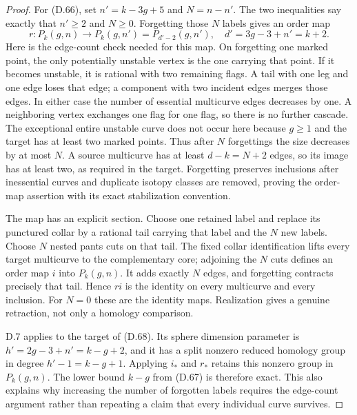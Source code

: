 \begin{proof}
For (D.66), set $n'=k-3g+5$ and $N=n-n'$.  The two
inequalities say exactly that $n'\geq2$ and $N\geq0$.
Forgetting those $N$ labels gives an order map
\[
 r:P_k(g,n)\longrightarrow
       P_k(g,n')=P_{d'-2}(g,n'),\quad d'=3g-3+n'=k+2.
                                                               \tag{D.68}
\]
Here is the edge-count check needed for this map.
On forgetting one marked point, the only potentially
unstable vertex is the one carrying that point.  If it
becomes unstable, it is rational with two remaining
flags.  A tail with one leg and one edge loses that
edge; a component with two incident edges merges those
edges.  In either case the number of essential
multicurve edges decreases by one.  A neighboring
vertex exchanges one flag for one flag, so there is
no further cascade.  The exceptional entire unstable
curve does not occur here because $g\geq1$ and the
target has at least two marked points.  Thus after
$N$ forgettings the size decreases by at most $N$.
A source multicurve has at least
$d-k=N+2$ edges, so its image has at least two,
as required in the target.  Forgetting preserves
inclusions after inessential curves and duplicate
isotopy classes are removed, proving the order-map
assertion with its exact stabilization convention.

The map has an explicit section.  Choose one retained
label and replace its punctured collar by a rational
tail carrying that label and the $N$ new labels.
Choose $N$ nested pants cuts on that tail.  The fixed
collar identification lifts every target multicurve
to the complementary core; adjoining the $N$ cuts
defines an order map $i$ into $P_k(g,n)$.  It adds
exactly $N$ edges, and forgetting contracts precisely
that tail.  Hence $r i$ is the identity on every
multicurve and every inclusion.  For $N=0$ these are
the identity maps.  Realization gives a genuine
retraction, not only a homology comparison.

D.7 applies to the target of (D.68).  Its sphere
dimension parameter is $h'=2g-3+n'=k-g+2$, and it
has a split nonzero reduced homology group in degree
$h'-1=k-g+1$.  Applying $i_*$ and $r_*$ retains this
nonzero group in $P_k(g,n)$.  The lower bound
$k-g$ from (D.67) is therefore exact.  This also
explains why increasing the number of forgotten
labels requires the edge-count argument rather than
repeating a claim that every individual curve survives.


\end{proof}
